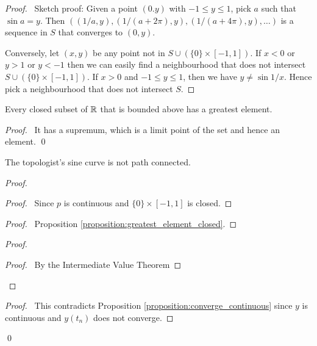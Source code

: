 \begin{proof}
    \pf\ Sketch proof: Given a point $(0.y)$ with $-1 \leq y \leq 1$, pick $a$ such that $\sin a = y$. Then $((1/a,y), (1/(a+2\pi),y), (1/(a+4\pi),y), \ldots)$ is a sequence
    in $S$ that converges to $(0,y)$.

    Conversely, let $(x,y)$ be any point not in $S \cup (\{0\} \times [-1,1])$. If $x < 0$ or $y > 1$ or $y < -1$ then we can easily find a neighbourhood that does not intersect
    $S \cup (\{0\} \times [-1,1])$. If $x > 0$ and $-1 \leq y \leq 1$, then we have $y \neq \sin 1/x$. Hence pick a neighbourhood that does not intersect $S$.
\end{proof}

\begin{proposition}
    \label{proposition:greatest_element_closed}
    Every closed subset of $\mathbb{R}$ that is bounded above has a greatest element.
\end{proposition}

\begin{proof}
    \pf\ It has a supremum, which is a limit point of the set and hence an element. \qed
\end{proof}

\begin{proposition}[CC]
    The topologist's sine curve is not path connected.
\end{proposition}

\begin{proof}
    \pf
    \begin{proof}
        \pf\ Since $p$ is continuous and $\{0\} \times [-1,1]$ is closed.
    \end{proof}
    \begin{proof}
        \pf\ Proposition \ref{proposition:greatest_element_closed}.
    \end{proof}
    \step{5}{\pick\ a sequence $t_n$ in $(b,1]$ such that $t_n \rightarrow b$ and $y(t_n) = (-1)^n$ for all $n$}
    \begin{proof}
        \begin{proof}
            \pf\ By the Intermediate Value Theorem
        \end{proof}
    \end{proof}
    \qedstep
    \begin{proof}
        \pf\ This contradicts Proposition \ref{proposition:converge_continuous} since $y$ is continuous and $y(t_n)$ does not converge.
    \end{proof}
    \qed
\end{proof}


